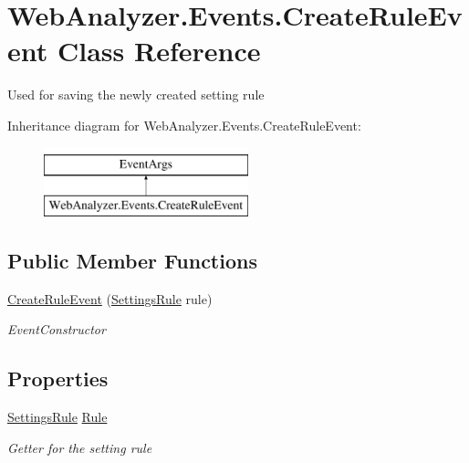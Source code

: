 \hypertarget{class_web_analyzer_1_1_events_1_1_create_rule_event}{}\section{Web\+Analyzer.\+Events.\+Create\+Rule\+Event Class Reference}
\label{class_web_analyzer_1_1_events_1_1_create_rule_event}


Used for saving the newly created setting rule  


Inheritance diagram for Web\+Analyzer.\+Events.\+Create\+Rule\+Event\+:\begin{figure}[H]
\begin{center}
\leavevmode
\includegraphics[height=2.000000cm]{class_web_analyzer_1_1_events_1_1_create_rule_event}
\end{center}
\end{figure}
\subsection*{Public Member Functions}
\begin{DoxyCompactItemize}
\item 
\hyperlink{class_web_analyzer_1_1_events_1_1_create_rule_event_ac5962b1de36f092453cc68f4e7247a97}{Create\+Rule\+Event} (\hyperlink{class_web_analyzer_1_1_models_1_1_settings_model_1_1_settings_rule}{Settings\+Rule} rule)
\begin{DoxyCompactList}\small\item\em Event\+Constructor \end{DoxyCompactList}\end{DoxyCompactItemize}
\subsection*{Properties}
\begin{DoxyCompactItemize}
\item 
\hyperlink{class_web_analyzer_1_1_models_1_1_settings_model_1_1_settings_rule}{Settings\+Rule} \hyperlink{class_web_analyzer_1_1_events_1_1_create_rule_event_a71f6a5e08aac9efa2b7da9052f8890e3}{Rule}
\begin{DoxyCompactList}\small\item\em Getter for the setting rule \end{DoxyCompactList}\end{DoxyCompactItemize}

